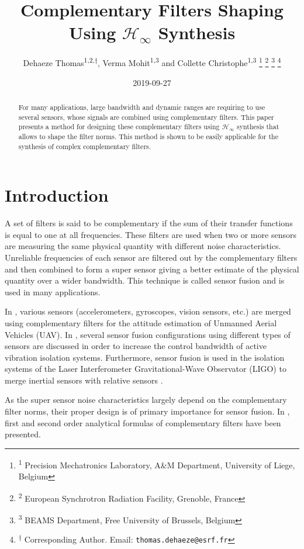 \documentclass[letterpaper, 10 pt, conference]{ieeeconf}
\author{Dehaeze Thomas\textsuperscript{1,2,$\dagger$}, Verma Mohit\textsuperscript{1,3} and Collette Christophe\textsuperscript{1,3}  \thanks{\textsuperscript{1} Precision Mechatronics Laboratory, A\&M Department, University of Liege, Belgium} \thanks{\textsuperscript{2} European Synchrotron Radiation Facility, Grenoble, France} \thanks{\textsuperscript{3} BEAMS Department, Free University of Brussels, Belgium} \thanks{\textsuperscript{$\dagger$} Corresponding Author. Email: {\tt\small thomas.dehaeze@esrf.fr}}}
\date{2019-09-27}
\title{Complementary Filters Shaping Using \(\mathcal{H}_\infty\) Synthesis}
\begin{document}
\maketitle


\begin{abstract}
For many applications, large bandwidth and dynamic ranges are requiring to use several sensors, whose signals are combined using complementary filters.
This paper presents a method for designing these complementary filters using \(\mathcal{H}_\infty\) synthesis that allows to shape the filter norms.
This method is shown to be easily applicable for the synthesis of complex complementary filters.
\end{abstract}

\section{Introduction}
\label{sec:orgef65f8b}
\label{sec:introduction}
A set of filters is said to be complementary if the sum of their transfer functions is equal to one at all frequencies.
These filters are used when two or more sensors are measuring the same physical quantity with different noise characteristics. Unreliable frequencies of each sensor are filtered out by the complementary filters and then combined to form a super sensor giving a better estimate of the physical quantity over a wider bandwidth.
This technique is called sensor fusion and is used in many applications.\par
In \cite{zimmermann92_high_bandw_orien_measur_contr,corke04_inert_visual_sensin_system_small_auton_helic,min15_compl_filter_desig_angle_estim}, various sensors (accelerometers, gyroscopes, vision sensors, etc.) are merged using complementary filters for the attitude estimation of Unmanned Aerial Vehicles (UAV).
In \cite{collette15_sensor_fusion_method_high_perfor}, several sensor fusion configurations using different types of sensors are discussed in order to increase the control bandwidth of active vibration isolation systems.
Furthermore, sensor fusion is used in the isolation systems of the Laser Interferometer Gravitational-Wave Observator (LIGO) to merge inertial sensors with relative sensors
\cite{matichard15_seism_isolat_advan_ligo,hua04_polyp_fir_compl_filter_contr_system}. \par
As the super sensor noise characteristics largely depend on the complementary filter norms, their proper design is of primary importance for sensor fusion.
In \cite{corke04_inert_visual_sensin_system_small_auton_helic,jensen13_basic_uas,min15_compl_filter_desig_angle_estim}, first and second order analytical formulas of complementary filters have been presented.
\end{document}
